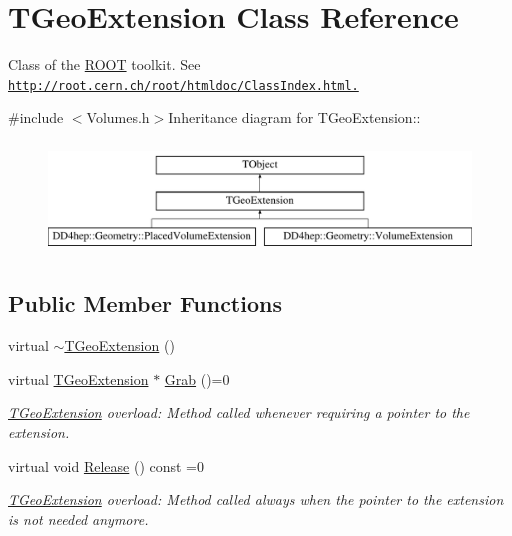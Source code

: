\hypertarget{class_t_geo_extension}{
\section{TGeoExtension Class Reference}
\label{class_t_geo_extension}
}


Class of the \hyperlink{namespace_r_o_o_t}{ROOT} toolkit. See \href{http://root.cern.ch/root/htmldoc/ClassIndex.html.}{\tt http://root.cern.ch/root/htmldoc/ClassIndex.html.}  


{\ttfamily \#include $<$Volumes.h$>$}Inheritance diagram for TGeoExtension::\begin{figure}[H]
\begin{center}
\leavevmode
\includegraphics[height=3cm]{class_t_geo_extension}
\end{center}
\end{figure}
\subsection*{Public Member Functions}
\begin{DoxyCompactItemize}
\item 
virtual \hyperlink{class_t_geo_extension_a07855c18b6678a4f6f4f125b85727fa1}{$\sim$TGeoExtension} ()
\item 
virtual \hyperlink{class_t_geo_extension}{TGeoExtension} $\ast$ \hyperlink{class_t_geo_extension_addd8a323d93527519b94e2db3acbf9d5}{Grab} ()=0
\begin{DoxyCompactList}\small\item\em \hyperlink{class_t_geo_extension}{TGeoExtension} overload: Method called whenever requiring a pointer to the extension. \item\end{DoxyCompactList}\item 
virtual void \hyperlink{class_t_geo_extension_af3013d9059744f1d7f9f9037a57bf3da}{Release} () const =0
\begin{DoxyCompactList}\small\item\em \hyperlink{class_t_geo_extension}{TGeoExtension} overload: Method called always when the pointer to the extension is not needed anymore. \item\end{DoxyCompactList}\end{DoxyCompactItemize}


